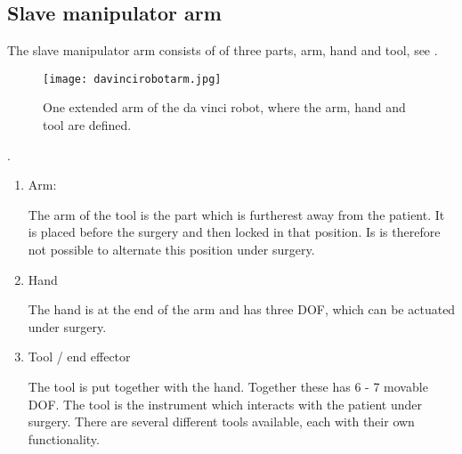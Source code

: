 \subsection*{Slave manipulator arm}
The slave manipulator arm consists of of three parts, arm, hand and tool, see .

\begin{figure}[H]
	\centering
		\centering
		\texttt{[image: davincirobotarm.jpg]}
		\caption{One extended arm of the da vinci robot, where the arm, hand and tool are defined.}
		\label{fig:davinciarmrobot}
\end{figure}
. 


\begin{enumerate}
\item Arm:

The arm of the tool is the part which is furtherest away from the patient. It is placed before the surgery and then locked in that position. Is is therefore not possible to alternate this position under surgery.
\item Hand

The hand is at the end of the arm and has three \gls{DOF}, which can be actuated under surgery.
\item Tool / end effector 

The tool is put together with the hand. Together these has 6 - 7 movable \gls{DOF}. The tool is the instrument which interacts with the patient under surgery. There are several different tools available, each with their own functionality. 
\end{enumerate}

